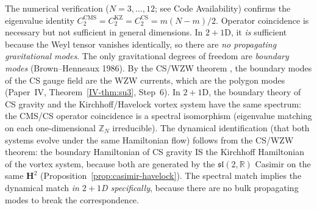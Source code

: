 \begin{remark}
\label{rmk:cms-cs-physical}
The numerical verification
($N = 3,\ldots,12$; see Code Availability)
confirms the eigenvalue identity $C_2^{\mathrm{CMS}} =
C_2^{\mathrm{KZ}} = C_2^{\mathrm{CS}} = m(N{-}m)/2$.
Operator coincidence is necessary but not sufficient
in general dimensions.
In $2{+}1$D, it \emph{is} sufficient because
the Weyl tensor vanishes identically, so there are
\emph{no propagating gravitational modes}.
The only gravitational degrees of freedom are
\emph{boundary modes} (Brown--Henneaux 1986).
By the CS/WZW theorem \citep{Witten1988}, the boundary
modes of the CS gauge field are the WZW currents, which
are the polygon modes (Paper~IV, Theorem~\ref*{IV-thm:su3}, Step~6).
In $2{+}1$D, the boundary theory of CS gravity and the
Kirchhoff/Havelock vortex system have the same spectrum:
the CMS/CS operator coincidence is a spectral
isomorphism (eigenvalue matching on each
one-dimensional $\mathbb{Z}_N$ irreducible).
The dynamical identification (that both systems evolve
under the same Hamiltonian flow) follows from the
CS/WZW theorem: the boundary Hamiltonian of CS gravity
IS the Kirchhoff Hamiltonian of the vortex system,
because both are generated by the $\mathfrak{sl}(2,\mathbb{R})$
Casimir on the same $\mathbf{H}^2$ (Proposition~\ref{prop:casimir-havelock}).
The spectral match implies the dynamical match
\emph{in $2{+}1$D specifically}, because there are no
bulk propagating modes to break the correspondence.
\end{remark}

